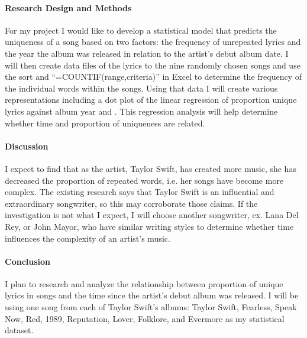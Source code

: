 \documentclass[12pt]{article}
\begin{document}
\paragraph{Research Design and Methods}
For my project I would like to develop a statistical model that predicts the uniqueness of a song based on two factors: the frequency of unrepeated lyrics and the year the album was released in relation to the artist’s debut album date. I will then create data files of the lyrics to the nine randomly chosen songs and use the sort and “=COUNTIF(range,criteria)” in Excel to determine the frequency of the individual words within the songs. Using that data I will create various representations including a dot plot of the linear regression of proportion unique lyrics against album year and . This regression analysis will help determine whether time and proportion of uniqueness are related. 

\paragraph{Discussion}
I expect to find that as the artist, Taylor Swift, has created more music, she has decreased the proportion of repeated words, i.e. her songs have become more complex. The existing research says that Taylor Swift is an influential and extraordinary songwriter, so this may corroborate those claims. If the investigation is not what I expect, I will choose another songwriter, ex. Lana Del Rey, or John Mayor, who have similar writing styles to determine whether time influences the complexity of an artist’s music. 

\paragraph{Conclusion}
I plan to research and analyze the relationship between proportion of unique lyrics in songs and the time since the artist's debut album was released. I will be using one song from each of Taylor Swift's albums: Taylor Swift, Fearless, Speak Now, Red, 1989, Reputation, Lover, Folklore, and Evermore as my statistical dataset. 



\end{document}
